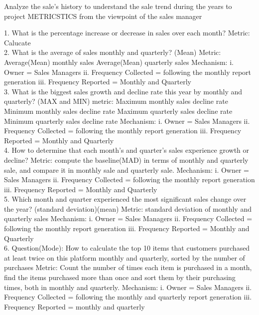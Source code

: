 \documentclass[12pt,letterpaper]{report}
\begin{document}

Analyze the sale's history to understand the sale trend during the years to project METRICSTICS from the viewpoint of the sales manager


1. What is the percentage increase or decrease in sales over each month?
Metric: Calucate\\[1\baselineskip]

2. What is the average of sales monthly and quarterly? (Mean)
Metric: 
Average(Mean) monthly sales
Average(Mean) quarterly sales
Mechanism:
i. Owner = Sales Managers
ii. Frequency Collected = following the monthly report generation
iii. Frequency Reported = Monthly and Quarterly\\[1\baselineskip]

3. What is the biggest sales growth and decline rate this year by monthly and quarterly? (MAX and MIN)
metric:
Maximum monthly sales decline rate
Minimum monthly sales decline rate
Maximum quarterly sales decline rate
Minimum quarterly sales decline rate
Mechanism:
i. Owner = Sales Managers
ii. Frequency Collected = following the monthly report generation
iii. Frequency Reported = Monthly and Quarterly\\[1\baselineskip]


4. How to determine that each month's and quarter’s  sales experience growth or decline?
Metric: compute the baseline(MAD) in terms of monthly and quarterly sale, and compare it in monthly sale and quarterly sale.
Mechanism:
i. Owner = Sales Managers
ii. Frequency Collected = following the monthly report generation
iii. Frequency Reported = Monthly and Quarterly\\[1\baselineskip]

5. Which month and quarter experienced the most significant sales change over the year? (standard deviation)(mean)
Metric: standard deviation of monthly and quarterly sales
Mechanism:
i. Owner = Sales Managers
ii. Frequency Collected = following the monthly report generation
iii. Frequency Reported = Monthly and Quarterly\\[1\baselineskip]


6. Question(Mode): How to calculate the top 10 items that customers purchased at least twice on this platform monthly and quarterly, sorted by the number of purchases 
Metric: Count the number of times each item is purchased in a month, find the items purchased more than once and sort them by their purchasing times, both in monthly and quarterly.
Mechanism:
i. Owner = Sales Managers
ii. Frequency Collected = following the monthly and quarterly report generation
iii. Frequency Reported = monthly and quarterly\\[1\baselineskip]
\end{document}
